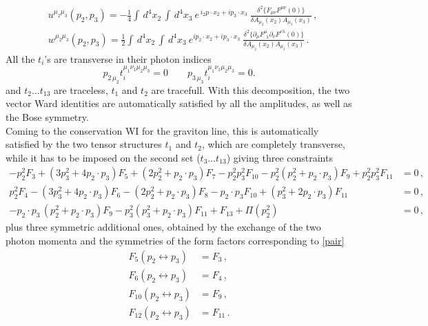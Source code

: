 \documentclass[a4paper,11pt,openright,twoside]{book}
\numberwithin{equation}{section}
\begin{document}
{{\begin{align}
	&u^{\mu_2\mu_3}(p_2,p_3) = -\frac{1}{4}\int\,d^4x_2\,\int\,d^4x_3\ e^{\,i_2p\cdot x_2 + i p_3\cdot x_3}\ 
	\frac{\delta^2 \{F_{\mu\nu}F^{\mu\nu}(0)\}} {\delta A_{\mu_2}(x_2) A_{\mu_3}(x_3)} \,,
	\label{one}\\
	&w^{\mu_2\mu_3}(p_2,p_3) = \frac{1}{2} \int\,d^4x_2\,\int\,d^4x_3\ e^{ip_2\cdot x_2 + i p_3\cdot x_3}\
	\frac{\delta^2 \{\partial_{\mu} F^{\mu}_{\ \,\lambda}\partial_{\nu}F^{\nu\lambda}(0)\}} 
	{\delta A_{\mu_2}(x_2) A_{\mu_3}(x_3)}\,.\label{two}
\end{align}
All the $t_i$'s are transverse in their photon indices
\begin{equation}
	p_{2\,\mu_2} t_i^{\mu_1\nu_1\mu_2\mu_3}=0  \qquad p_{3\,\mu_3} t_i^{\mu_1\nu_1\mu_2\mu_3}=0.
\end{equation}
and $t_2\ldots t_{13}$ are traceless, $t_1$ and $t_2$ are tracefull. With this decomposition, the two vector Ward identities are automatically satisfied by all the amplitudes, as well as the Bose symmetry. \\ 
Coming to the conservation WI for the graviton line, this is automatically satisfied by the two tensor structures $t_1$ and $t_2$, which are completely transverse, while it has to be imposed on the second set ($t_3\ldots t_{13}$) giving three constraints  
\begin{align}
	- p_2^2 F_3 + (3 p_3^2 + 4 p_2\cdot p_3) F_5 + (2 p_2^2 + p_2\cdot p_3) F_7 - p_2^2 p_3^2 F_{10}
	- p_2^2 (p_2^2 + p_2\cdot p_3) F_9 + p_2^2 p_3^2 F_{11} &= 0\,, \label{WIcons1a}\\[2ex]
	p_2^2 F_4 - (3 p_3^2 + 4 p_2\cdot p_3) F_6 - (2 p_2^2 + p_2\cdot p_3) F_8 - p_2\cdot p_3 F_{10}
	+ (p_3^2 + 2 p_2\cdot p_3) F_{11} &= 0\,,\label{WIcons1b}\\[2ex]
	-p_2\cdot p_3 \,(p_2^2 + p_2\cdot p_3) F_9 - p_3^2 (p_3^2 + p_2\cdot p_3) F_{11} + F_{13} + \Pi(p_2^2)  &=0 \,,
	\label{cwi}
\end{align}
plus three symmetric additional ones, obtained by the exchange of the two photon momenta and the symmetries of the form factors corresponding to \eqref{pair}
\begin{equation}
	\begin{split}
		\label{pair1}
		F_5(p_2\leftrightarrow p_3)&=F_3\,,\\
		F_6(p_2\leftrightarrow p_3)&=F_4\,,\\
		F_{10}(p_2\leftrightarrow p_3)&=F_9\,,\\
		F_{12}(p_2\leftrightarrow p_3)&=F_{11}\,.

\end{split}
\end{equation}}}
\end{document}
